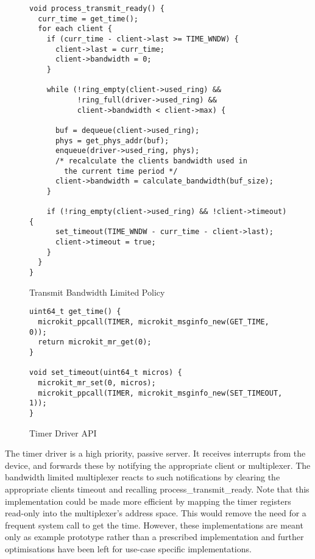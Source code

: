 \begin{figure} [H]
    \begin{verbatim}
void process_transmit_ready() {
  curr_time = get_time();
  for each client {
    if (curr_time - client->last >= TIME_WNDW) {
      client->last = curr_time;
      client->bandwidth = 0;
    }
    
    while (!ring_empty(client->used_ring) && 
           !ring_full(driver->used_ring) && 
           client->bandwidth < client->max) {

      buf = dequeue(client->used_ring);
      phys = get_phys_addr(buf);
      enqueue(driver->used_ring, phys);
      /* recalculate the clients bandwidth used in 
        the current time period */ 
      client->bandwidth = calculate_bandwidth(buf_size);
    }

    if (!ring_empty(client->used_ring) && !client->timeout) {
      set_timeout(TIME_WNDW - curr_time - client->last);
      client->timeout = true;
    }
  }
}
\end{verbatim}
\caption{Transmit Bandwidth Limited Policy}
\label{l:bandwidth}
\end{figure}

\begin{figure} [H]
    \begin{verbatim}
uint64_t get_time() {
  microkit_ppcall(TIMER, microkit_msginfo_new(GET_TIME, 0));
  return microkit_mr_get(0);
}
        
void set_timeout(uint64_t micros) {
  microkit_mr_set(0, micros);
  microkit_ppcall(TIMER, microkit_msginfo_new(SET_TIMEOUT, 1));
}
\end{verbatim}
\caption{Timer Driver API}
\label{l:timer}
\end{figure}

The timer driver is a high priority, passive server. It receives interrupts from the device,
and forwards these by notifying the appropriate client or multiplexer. The bandwidth limited
multiplexer reacts to such notifications by clearing the appropriate clients timeout and
recalling process\_transmit\_ready. Note that this implementation could be made more efficient
by mapping the timer registers read-only into the multiplexer's address space. This would remove
the need for a frequent system call to get the time. However, these implementations are 
meant only as example prototype rather than a prescribed implementation and further optimisations
have been left for use-case specific implementations. \\

